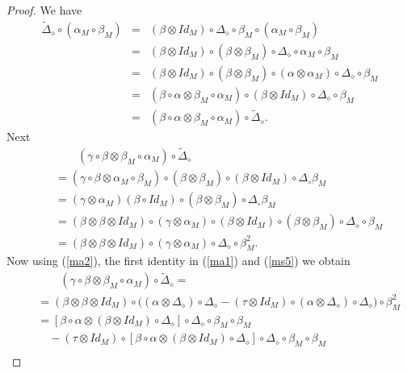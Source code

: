\documentclass{article}
\theoremstyle{definition}
\theoremstyle{remark}
\numberwithin{equation}{section}
\begin{document}
\begin{proof}
We have
\begin{eqnarray}
\tilde\Delta_\diamond\circ(\alpha_M\circ\beta_M)
&=&(\beta\otimes Id_M)\circ\Delta_\diamond\circ\beta_M\circ(\alpha_M\circ\beta_M)\nonumber\\
&=&(\beta\otimes Id_M)\circ(\beta\otimes\beta_M)\circ\Delta_\diamond\circ\alpha_M\circ\beta_M\nonumber\\
&=&(\beta\otimes Id_M)\circ(\beta\otimes\beta_M)\circ(\alpha\otimes\alpha_M)\circ\Delta_\diamond\circ\beta_M\nonumber\\
&=&(\beta\circ\alpha\otimes \beta_M\circ\alpha_M)\circ(\beta\otimes Id_M)\circ\Delta_\diamond\circ\beta_M\nonumber\\
&=&(\beta\circ\alpha\otimes\beta_M\circ\alpha_M)\circ\tilde\Delta_\diamond.\nonumber
\end{eqnarray}
Next
\begin{eqnarray}
 &&\qquad(\gamma\circ\beta\otimes\beta_M\circ\alpha_M)\circ\tilde\Delta_\diamond\nonumber\\
&&=(\gamma\circ\beta\otimes\alpha_M\circ\beta_M)\circ(\beta\otimes\beta_M)\circ(\beta\otimes Id_M)\circ\Delta_\circ\beta_M\nonumber\\
&&=(\gamma\otimes\alpha_M)(\beta\circ Id_M)\circ(\beta\otimes\beta_M)\circ\Delta_\circ\beta_M \nonumber\\
&&=(\beta\otimes\beta\otimes Id_M)\circ(\gamma\otimes \alpha_M)\circ(\beta\otimes Id_M)\circ(\beta\otimes\beta_M)\circ\Delta_\diamond\circ\beta_M\nonumber\\
&&=(\beta\otimes\beta\otimes Id_M)\circ(\gamma\otimes\alpha_M)\circ\Delta_\diamond \circ\beta_M^2\nonumber.
\end{eqnarray}
Now using (\ref{ma2}), the first identity in (\ref{ma1}) and (\ref{ms5}) we obtain
\begin{eqnarray}
&&\qquad(\gamma\circ\beta\otimes\beta_M\circ\alpha_M)\circ\tilde\Delta_\diamond=\nonumber\\
&&=(\beta\otimes\beta\otimes Id_M)\circ\Big((\alpha\otimes\Delta_\diamond)\circ\Delta_\diamond
-(\tau\otimes Id_M)\circ(\alpha\otimes\Delta_\diamond)\circ\Delta_\diamond\Big)\circ\beta^2_M\nonumber\\
&&=[\beta\circ\alpha\otimes(\beta\otimes Id_M)\circ\Delta_\diamond]\circ\Delta_\diamond\circ\beta_M\circ\beta_M\nonumber\\
&&\quad-(\tau\otimes Id_M)\circ[\beta\circ\alpha\otimes(\beta\otimes Id_M)\circ\Delta_\diamond]\circ\Delta_\diamond\circ\beta_M\circ\beta_M\nonumber\\

\end{eqnarray}
\end{proof}
\end{document}
